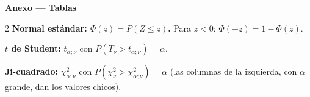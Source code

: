 \documentclass[10pt,a4paper]{extarticle}
\newcommand{\chis}{\chi^2}
\begin{document}
\newpage
\begin{center}{\large\bfseries\color{azul} Anexo --- Tablas}\end{center}
\vspace{-6pt}
\begin{multicols}{2}
\textbf{Normal estándar: $\Phi(z)=P(Z\le z)$.} Para $z<0$: $\Phi(-z)=1-\Phi(z)$.
\begin{center}
\scriptsize\setlength{\tabcolsep}{1.5pt}\renewcommand{\arraystretch}{0.92}

\end{center}

\columnbreak
\textbf{$t$ de Student:} $t_{\alpha;\nu}$ con $P(T_\nu>t_{\alpha;\nu})=\alpha$.
\begin{center}
\footnotesize\setlength{\tabcolsep}{4pt}\renewcommand{\arraystretch}{0.95}

\end{center}
\end{multicols}
\vspace{-4pt}
\textbf{Ji-cuadrado:} $\chis_{\alpha;\nu}$ con $P(\chis_\nu>\chis_{\alpha;\nu})=\alpha$ (las columnas de la izquierda, con $\alpha$ grande, dan los valores chicos).
\begin{center}
\footnotesize\setlength{\tabcolsep}{3.6pt}\renewcommand{\arraystretch}{0.95}

\end{center}
\end{document}

